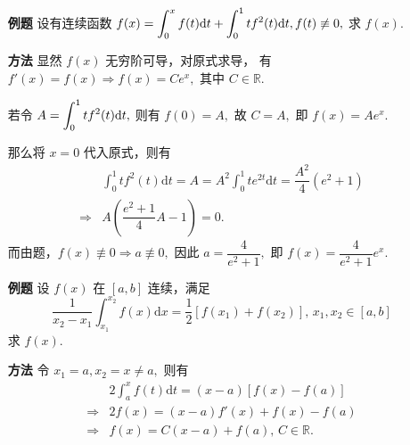 
\begin{enumerate}
    \item[\textbf{例题}] 设有连续函数 $\displaystyle f(x) = \int_0^xf(t)\mathrm{d}t+\int_0^1tf^2(t)\mathrm{d}t,
    f(t)\not\equiv 0, $ 
    求 $ f(x). $ 
    \item[\textbf{方法}] 显然 $ f(x) $ 无穷阶可导，对原式求导，
    有 $ f'(x) = f(x) \Rightarrow f(x) = Ce^x, $ 
    其中 $ C\in\mathbb{R}. $ 
    
    若令 $ A = \displaystyle\int_0^1tf^2(t)\mathrm{d}t, $ 
    则有 $ f(0) = A, $ 故 $ C = A, $ 即 $ f(x) = Ae^x. $ 

    那么将 $ x = 0 $ 代入原式，则有
    \begin{equation*}
        \begin{aligned}
            &\int_0^1tf^2(t)\mathrm{d}t = A = A^2\int_0^1te^{2t}\mathrm{d}t = \dfrac{A^2}{4}(e^2+1)\\ 
            \Rightarrow & A\left(\dfrac{e^2+1}{4}A-1\right) = 0.
        \end{aligned}
    \end{equation*}
    而由题，$ f(x)\not\equiv 0 \Rightarrow a \not\equiv 0, $ 
    因此 $ a = \dfrac{4}{e^2+1}, $ 即 $ f(x) = \dfrac{4}{e^2+1}e^x. $ 
\end{enumerate}

\begin{enumerate}
    \item[\textbf{例题}] 设 $ f(x) $ 在 $ [a,b] $ 连续，满足
    $$
        \dfrac{1}{x_2-x_1}\int_{x_1}^{x_2}f(x)\mathrm{d}x = \dfrac{1}{2}\left[f(x_1)+f(x_2)\right],\, 
        x_1,x_2\in[a,b]
    $$
    求 $ f(x). $ 
    \item[\textbf{方法}] 
    令 $ x_1 = a, x_2 = x \neq a, $ 则有
    \begin{equation*}
        \begin{aligned}
            &2\int_a^xf(t)\mathrm{d}t = (x-a)[f(x)-f(a)]\\ 
            \Rightarrow & 2f(x) = (x-a)f'(x) + f(x) - f(a)\\ 
            \Rightarrow & f(x) = C(x-a)+f(a),\, C\in \mathbb{R}.
        \end{aligned}
    \end{equation*}
\end{enumerate}

